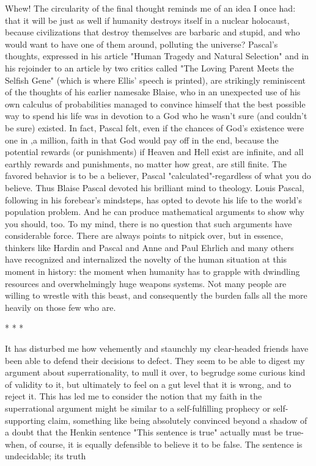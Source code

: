 Whew! The circularity of the final thought reminds me of an idea I once had: that it
will be just as well if humanity destroys itself in a nuclear holocaust, because
civilizations that destroy themselves are barbaric and stupid, and who would want to
have one of them around, polluting the universe?
        Pascal's thoughts, expressed in his article "Human Tragedy and Natural
Selection" and in his rejoinder to an article by two critics called "The Loving Parent
Meets the Selfish Gene" (which is where Ellis' speech is printed), are strikingly
reminiscent of the thoughts of his earlier namesake Blaise, who in an unexpected use
of his own calculus of probabilities managed to convince himself that the best
possible way to spend his life was in devotion to a God who he wasn't sure (and
couldn't be sure) existed. In fact, Pascal felt, even if the chances of God's existence
were one in ,a million, faith in that God would pay off in the end, because the
potential rewards (or punishments) if Heaven and Hell exist are infinite, and all
earthly rewards and punishments, no matter how great, are still finite. The favored
behavior is to be a believer, Pascal "calculated"-regardless of what you do believe.
Thus Blaise Pascal devoted his brilliant mind to theology.
        Louis Pascal, following in his forebear's mindsteps, has opted to devote his life
to the world's population problem. And he can produce mathematical arguments to
show why you should, too. To my mind, there is no question that such arguments
have considerable force. There are always points to nitpick over, but in essence,
thinkers like Hardin and Pascal and Anne and Paul Ehrlich and many others have
recognized and internalized the novelty of the human situation at this moment in
history: the moment when humanity has to grapple with dwindling resources and
overwhelmingly huge weapons systems. Not many people are willing to wrestle with
this beast, and consequently the burden falls all the more heavily on those few who
are.

                                          *    *   *

        It has disturbed me how vehemently and staunchly my clear-headed friends
have been able to defend their decisions to defect. They seem to be able to digest my
argument about superrationality, to mull it over, to begrudge some curious kind of
validity to it, but ultimately to feel on a gut level that it is wrong, and to reject it. This
has led me to consider the notion that my faith in the superrational argument might be
similar to a self-fulfilling prophecy or self-supporting claim, something like being
absolutely convinced beyond a shadow of a doubt that the Henkin sentence "This
sentence is true" actually must be true-when, of course, it is equally defensible to
believe it to be false. The sentence is undecidable; its truth




